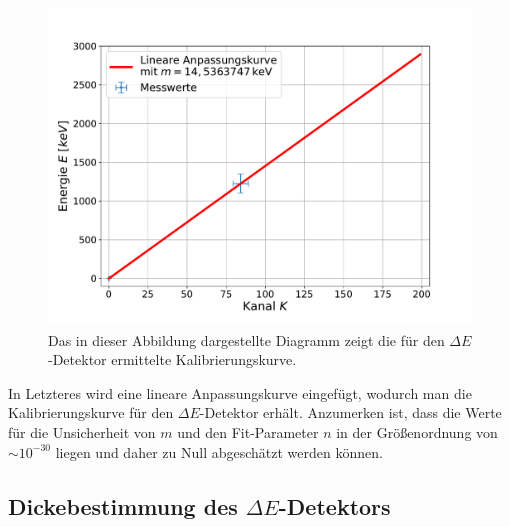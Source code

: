 \begin{figure}[H]
	\centering
	\includegraphics[width=1.0\textwidth]{src/dEDetectorCalibration}
	\caption{Das in dieser Abbildung dargestellte Diagramm zeigt die für den $\Delta E$-Detektor ermittelte Kalibrierungskurve.}
	\label{dEDetectorCalibration}
\end{figure}
\noindent In Letzteres wird eine lineare Anpassungskurve eingefügt, wodurch man die Kalibrierungskurve für den $\Delta E$-Detektor erhält.
Anzumerken ist, dass die Werte für die Unsicherheit von $m$ und den Fit-Parameter $n$ in der Größenordnung von $\sim10^{-30}$ liegen und daher zu Null abgeschätzt werden können.

\subsection{Dickebestimmung des $\Delta E$-Detektors} \label{sec:de_kalibration}

